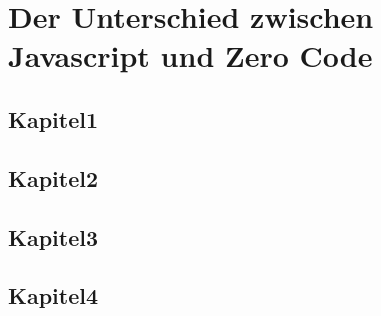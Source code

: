 \chapter{Der Unterschied zwischen Javascript und Zero Code}
\section{Kapitel1}
\section{Kapitel2}
\section{Kapitel3}
\section{Kapitel4}